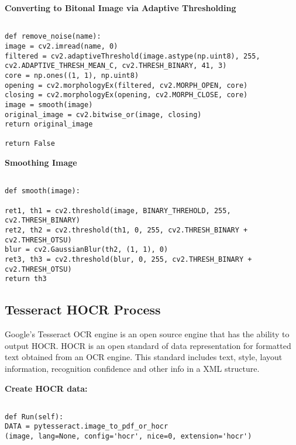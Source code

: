 \bigskip
\noindent
\textbf{Converting to Bitonal Image via Adaptive Thresholding}
\begin{footnotesize}
\begin{verbatim}

def remove_noise(name):
image = cv2.imread(name, 0)
filtered = cv2.adaptiveThreshold(image.astype(np.uint8), 255, 
cv2.ADAPTIVE_THRESH_MEAN_C, cv2.THRESH_BINARY, 41, 3)
core = np.ones((1, 1), np.uint8)
opening = cv2.morphologyEx(filtered, cv2.MORPH_OPEN, core)
closing = cv2.morphologyEx(opening, cv2.MORPH_CLOSE, core)
image = smooth(image)
original_image = cv2.bitwise_or(image, closing)
return original_image

return False
\end{verbatim}
\end{footnotesize}


\bigskip
\noindent
\textbf{Smoothing Image}
\begin{footnotesize}
\begin{verbatim}

def smooth(image):

ret1, th1 = cv2.threshold(image, BINARY_THREHOLD, 255, cv2.THRESH_BINARY)
ret2, th2 = cv2.threshold(th1, 0, 255, cv2.THRESH_BINARY + cv2.THRESH_OTSU)
blur = cv2.GaussianBlur(th2, (1, 1), 0)
ret3, th3 = cv2.threshold(blur, 0, 255, cv2.THRESH_BINARY + cv2.THRESH_OTSU)
return th3

\end{verbatim}
\end{footnotesize}
\bigskip
\noindent

\subsection{Tesseract HOCR Process}

Google's Tesseract OCR engine is an open source engine that has the ability to
output HOCR. HOCR is an open standard of data representation for
formatted text obtained from an OCR engine. This standard includes 
text, style, layout information, recognition confidence and other info
in a XML structure. 

\bigskip
\noindent
\textbf{Create HOCR data:}
\begin{footnotesize}
\begin{verbatim}

def Run(self):
DATA = pytesseract.image_to_pdf_or_hocr
(image, lang=None, config='hocr', nice=0, extension='hocr')

\end{verbatim}
\end{footnotesize}


